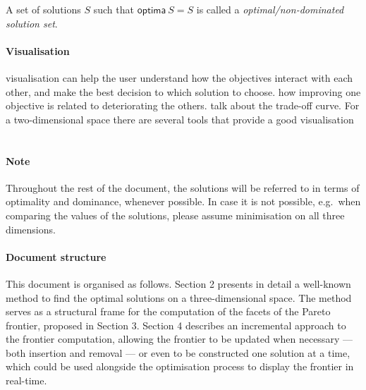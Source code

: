\begin{defn} 
A set of solutions $S$ such that $\mathsf{optima\ } S = S$ is called a \textit{optimal/non-dominated solution set}.
\end{defn}

\paragraph{Visualisation} visualisation can help the user understand how the objectives interact with each other, and make the best decision to which solution to choose. how improving one objective is related to deteriorating the others. talk about the trade-off curve.  For a two-dimensional space there are several tools that provide a good visualisation
\ \ 



\paragraph{Note} Throughout the rest of the document, the solutions will be referred to in terms of optimality and dominance, whenever possible. In case it is not possible, e.g.\ when comparing the values of the solutions, please assume minimisation on all three dimensions.

\paragraph{Document structure} This document is organised as follows. Section 2 presents in detail a well-known method to find the optimal solutions on a three-dimensional space. The method serves as a structural frame for the computation of the facets of the Pareto frontier, proposed in Section 3. Section 4 describes an incremental approach to the frontier computation, allowing the frontier to be updated when necessary --- both insertion and removal --- or even to be constructed one solution at a time, which could be used alongside the optimisation process to display the frontier in real-time.